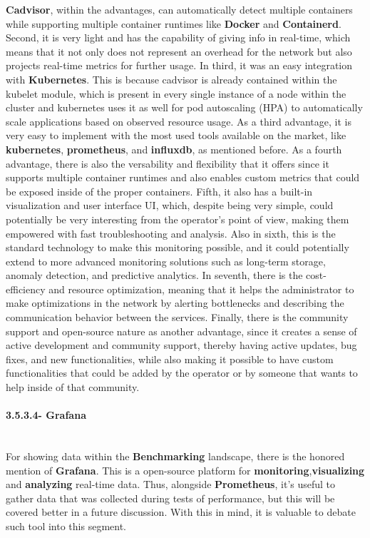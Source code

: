 \textbf{Cadvisor}, within the advantages, can automatically detect multiple containers while supporting multiple container runtimes like \textbf{Docker} and \textbf{Containerd}. Second, it is very light and has the capability of giving info in real-time, which means that it not only does not represent an overhead for the network but also projects real-time metrics for further usage. In third, it was an easy integration with \textbf{Kubernetes}. This is because cadvisor is already contained within the kubelet module, which is present in every single instance of a node within the cluster and kubernetes uses it as well for pod autoscaling (HPA) to automatically scale applications based on observed resource usage. As a third advantage, it is very easy to implement with the most used tools available on the market, like \textbf{kubernetes}, \textbf{prometheus}, and \textbf{influxdb}, as mentioned before. As a fourth advantage, there is also the versability and flexibility that it offers since it supports multiple container runtimes and also enables custom metrics that could be exposed inside of the proper containers. Fifth, it also has a built-in visualization and user interface UI, which, despite being very simple, could potentially be very interesting from the operator's point of view, making them empowered with fast troubleshooting and analysis. Also in sixth, this is the standard technology to make this monitoring possible, and it could potentially extend to more advanced monitoring solutions such as long-term storage, anomaly detection, and predictive analytics. In seventh, there is the cost-efficiency and resource optimization, meaning that it helps the administrator to make optimizations in the network by alerting bottlenecks and describing the communication behavior between the services. Finally, there is the community support and open-source nature as another advantage, since it creates a sense of active development and community support, thereby having active updates, bug fixes, and new functionalities, while also making it possible to have custom functionalities that could be added by the operator or by someone that wants to help inside of that community.


\paragraph{3.5.3.4- Grafana}\mbox{}\\
For showing data within the \textbf{Benchmarking} landscape, there is the honored mention of \textbf{Grafana}. This is a open-source platform for \textbf{monitoring},\textbf{visualizing} and \textbf{analyzing} real-time data. Thus, alongside \textbf{Prometheus}, it's useful to gather data that was collected during tests of performance, but this will be covered better in a future discussion. With this in mind, it is valuable to debate such tool into this segment.

